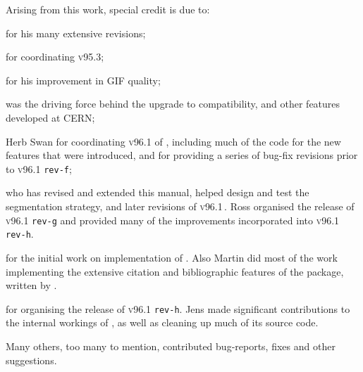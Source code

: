 \bigskip\noindent
Arising from this work, special credit is due to: 
\begin{htmllist}
\item [\Hennecke]  
for his many extensive revisions; 

\item [\Noworolski]  
for coordinating \textsc{v95.3};
 
\item [\Isani]  
for his improvement in GIF quality; 

%
\item [\Goossens]  
was the driving force behind the upgrade to \LaTeXe{} compatibility,
and other features developed at CERN;

\item [Herb Swan] 
for coordinating \textsc{v96.1} of \latextohtml, 
including much of the \Perl{} code 
for the new features that were introduced,
and for providing a series of bug-fix revisions 
prior to  \textsc{v96.1} \texttt{rev-f};

\item [\RossMoore] 
who has revised and extended this manual, helped design and test the 
segmentation strategy, and later revisions of \textsc{v96.1}\,.
Ross organised the release of \textsc{v96.1} \texttt{rev-g} 
and provided many of the improvements
incorporated into \textsc{v96.1} \texttt{rev-h}. 

\item [\Wilck] 
for the initial work on implementation of . 
Also Martin did most of the work implementing the extensive citation and
bibliographic features of the  package, written by \PatrickDaly.

\item [\Lippman] 
for organising the release of \textsc{v96.1} \texttt{rev-h}. 
Jens made significant contributions to
the internal workings of \latextohtml, 
as well as cleaning up much of its source code. 
\end{htmllist}

\htmlrule


\bigskip\noindent
Many others, too many to mention, contributed bug-reports, 
fixes and other suggestions.


